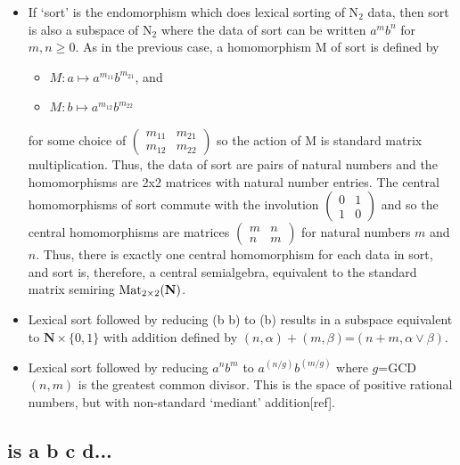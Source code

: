 \documentclass[11pt]{article}
\begin{document}
\begin{itemize}
\item{If `sort' is the endomorphism which does lexical sorting of N$_2$ data, then sort is also a subspace of N$_2$ where the 
data of sort can be written $a^m b^n$ for $m,n\ge 0$.  As in the previous case, a homomorphism M of sort is defined by  
\begin{itemize}
\item [] $M: a\mapsto a^{m_{11}} b^{m_{21}}$, and 
\item [] $M: b\mapsto a^{m_{12}} b^{m_{22}}$ 
\end{itemize}
for some choice of 
$
\left (
\begin{array}{cc} 
m_{11} & m_{21} \\ m_{12} & m_{22}  
\end{array}
\right ) 
$
so the action of M is standard matrix multiplication.  Thus, the data of sort are pairs of natural numbers and the 
homomorphisms are 2x2 matrices with natural number entries.  The central homomorphisms of sort 
commute with the involution 
$
\left (
\begin{array}{cc} 
0 & 1 \\ 1 & 0 
\end{array}
\right ) 
$
and so the central homomorphisms are matrices 
$
\left (
\begin{array}{cc} 
m & n \\ n & m 
\end{array}
\right ) 
$
for natural numbers $m$ and $n$.  Thus, there is exactly one central homomorphism for each data in sort, 
and sort is, therefore, a central semialgebra, equivalent to the standard matrix semiring ${\rm Mat}_{2\times2}(\mathbf N)$.
}

\item{Lexical sort followed by reducing (b b) to (b) results in a subspace equivalent to $\mathbf N\times\{0,1\}$ with addition
defined by $(n,\alpha)+(m,\beta)$=$(n+m,\alpha\vee\beta)$.}

\item{Lexical sort followed by reducing $a^n b^m$ to $a^{(n/g)} b^{(m/g)}$ where $g$=GCD$(n,m)$ is the greatest common divisor.  
This is the space of positive rational numbers, but with non-standard `mediant' addition[ref].}

\end{itemize}

\subsection{is a b c d...} 
\end{document}
